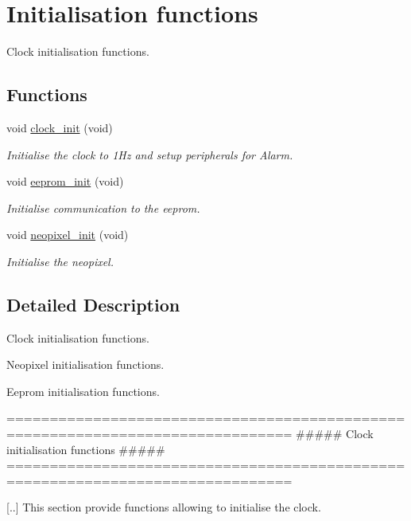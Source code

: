 \hypertarget{group___initialisation}{}\section{Initialisation functions}
\label{group___initialisation}


Clock initialisation functions.  


\subsection*{Functions}
\begin{DoxyCompactItemize}
\item 
void \hyperlink{group___initialisation_ga78ab77b57cf2e00089f0a3a22508524c}{clock\+\_\+init} (void)
\begin{DoxyCompactList}\small\item\em Initialise the clock to 1\+Hz and setup peripherals for Alarm. \end{DoxyCompactList}\item 
void \hyperlink{group___initialisation_ga4ec7f9d780da432051aa74ec5892a94c}{eeprom\+\_\+init} (void)
\begin{DoxyCompactList}\small\item\em Initialise communication to the eeprom. \end{DoxyCompactList}\item 
void \hyperlink{group___initialisation_gaac78468985e44a3e4d353ea9276b33bc}{neopixel\+\_\+init} (void)
\begin{DoxyCompactList}\small\item\em Initialise the neopixel. \end{DoxyCompactList}\end{DoxyCompactItemize}


\subsection{Detailed Description}
Clock initialisation functions. 

Neopixel initialisation functions.

Eeprom initialisation functions.

\begin{DoxyVerb} ===============================================================================
         ##### Clock initialisation functions #####
 ===============================================================================

 [..] This section provide functions allowing to initialise the clock.\end{DoxyVerb}


